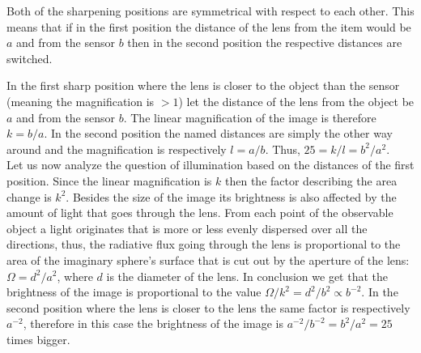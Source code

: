 {\ifEngHint
Both of the sharpening positions are symmetrical with respect to each other. This means that if in the first position the distance of the lens from the item would be $a$ and from the sensor $b$ then in the second position the respective distances are switched.
\fi


\ifEngSolution
In the first sharp position where the lens is closer to the object than the sensor (meaning the magnification is $>1$) let the distance of the lens from the object be $a$ and from the sensor $b$. The linear magnification of the image is therefore $k=b/a$. In the second position the named distances are simply the other way around and the magnification is respectively $l=a/b$. Thus, $25=k/l=b^2/a^2$.\\
Let us now analyze the question of illumination based on the distances of the first position. Since the linear magnification is $k$ then the factor describing the area change is $k^2$. Besides the size of the image its brightness is also affected by the amount of light that goes through the lens. From each point of the observable object a light originates that is more or less evenly dispersed over all the directions, thus, the radiative flux going through the lens is proportional to the area of the imaginary sphere’s surface that is cut out by the aperture of the lens: $\Omega=d^2/a^2$, where $d$ is the diameter of the lens. In conclusion we get that the brightness of the image is proportional to the value $\Omega/k^2=d^2/b^2\propto b^{-2}$. In the second position where the lens is closer to the lens the same factor is respectively $a^{-2}$, therefore in this case the brightness of the image is $a^{-2}/b^{-2}=b^2/a^2=25$ times bigger.
\fi
}